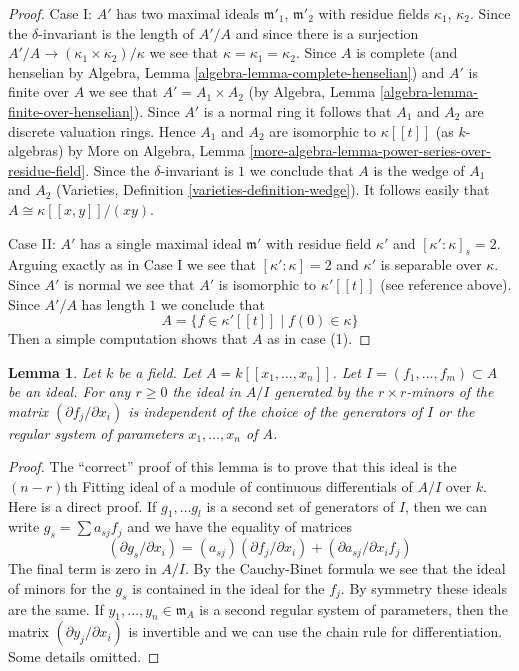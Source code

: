 \documentclass{stacks-project}
\theoremstyle{plain}
\newtheorem{lemma}[subsection]{Lemma}
\theoremstyle{definition}
\theoremstyle{remark}
\numberwithin{equation}{subsection}
\begin{document}
\begin{proof}
\medskip\noindent
Case I: $A'$ has two maximal ideals $\mathfrak m'_1$, $\mathfrak m'_2$
with residue fields $\kappa_1$, $\kappa_2$.
Since the $\delta$-invariant is the length of $A'/A$ and
since there is a surjection $A'/A \to (\kappa_1 \times \kappa_2)/\kappa$
we see that $\kappa = \kappa_1 = \kappa_2$. Since $A$ is complete
(and henselian by Algebra, Lemma \ref{algebra-lemma-complete-henselian})
and $A'$ is finite over $A$ we see that $A' = A_1 \times A_2$
(by Algebra, Lemma \ref{algebra-lemma-finite-over-henselian}).
Since $A'$ is a normal ring it follows that $A_1$ and $A_2$ are
discrete valuation rings.
Hence $A_1$ and $A_2$ are isomorphic to $\kappa[[t]]$
(as $k$-algebras) by
More on Algebra, Lemma \ref{more-algebra-lemma-power-series-over-residue-field}.
Since the $\delta$-invariant is $1$ we conclude that $A$
is the wedge of $A_1$ and $A_2$
(Varieties, Definition \ref{varieties-definition-wedge}).
It follows easily that $A \cong \kappa[[x, y]]/(xy)$.

\medskip\noindent
Case II: $A'$ has a single maximal ideal $\mathfrak m'$ with residue
field $\kappa'$ and $[\kappa' : \kappa]_s = 2$. Arguing exactly
as in Case I we see that $[\kappa' : \kappa] = 2$ and $\kappa'$
is separable over $\kappa$. Since $A'$ is normal we see that
$A'$ is isomorphic to $\kappa'[[t]]$ (see reference above).
Since $A'/A$ has length $1$ we conclude that
$$
A = \{f \in \kappa'[[t]] \mid f(0) \in \kappa\}
$$
Then a simple computation shows that $A$ as in case (1).
\end{proof}

\begin{lemma}
\label{lemma-fitting-ideal-well-defined}
Let $k$ be a field. Let $A = k[[x_1, \ldots, x_n]]$. Let
$I = (f_1, \ldots, f_m) \subset A$ be an ideal. For any
$r \geq 0$ the ideal in $A/I$ generated by the $r \times r$-minors
of the matrix $(\partial f_j/\partial x_i)$ is independent
of the choice of the generators of $I$ or the
regular system of parameters $x_1, \ldots, x_n$ of $A$.
\end{lemma}

\begin{proof}
The ``correct'' proof of this lemma is to prove that this ideal
is the $(n - r)$th Fitting ideal of a module of continuous differentials
of $A/I$ over $k$. Here is a direct proof.
If $g_1, \ldots g_l$ is a second set of generators of $I$, then
we can write $g_s = \sum a_{sj}f_j$ and we have the equality of matrices
$$
(\partial g_s/\partial x_i) = (a_{sj}) (\partial f_j/\partial x_i)
+ (\partial a_{sj}/\partial x_i f_j)
$$
The final term is zero in $A/I$.
By the Cauchy-Binet formula we see that the ideal of minors for the
$g_s$ is contained in the ideal for the $f_j$. By symmetry
these ideals are the same. If $y_1, \ldots, y_n \in \mathfrak m_A$
is a second regular system of parameters, then the matrix
$(\partial y_j/\partial x_i)$
is invertible and we can use the chain rule for differentiation.
Some details omitted.
\end{proof}
\end{document}

